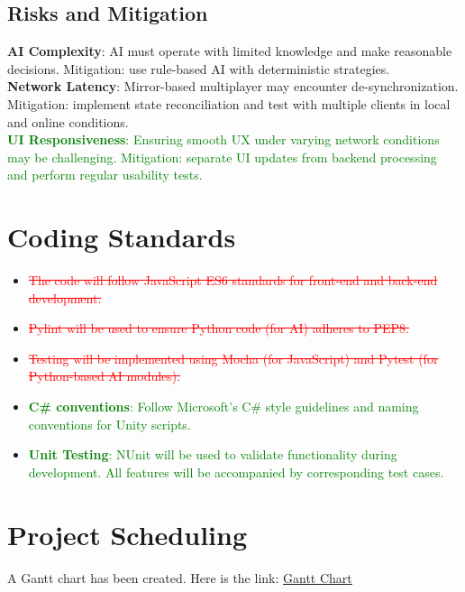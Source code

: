 \documentclass[12pt]{article}
\newcommand{\removed}[1]{\textcolor{red}{\sout{#1}}}
\newcommand{\added}[1]{\textcolor{green}{#1}}
\begin{document}
\subsection*{Risks and Mitigation}
\textbf{AI Complexity}: AI must operate with limited knowledge and make reasonable decisions. Mitigation: use rule-based AI with deterministic strategies.\\
\textbf{Network Latency}: Mirror-based multiplayer may encounter de-synchronization. Mitigation: implement state reconciliation and test with multiple clients in local and online conditions.\\
\added{\textbf{UI Responsiveness}: Ensuring smooth UX under varying network conditions may be challenging. Mitigation: separate UI updates from backend processing and perform regular usability tests.}

\section*{Coding Standards}
\begin{itemize}
    \item \removed{The code will follow JavaScript ES6 standards for front-end and back-end development.}
    \item \removed{Pylint will be used to ensure Python code (for AI) adheres to PEP8.}
    \item \removed{Testing will be implemented using Mocha (for JavaScript) and Pytest (for Python-based AI modules).}
    \item \added{\textbf{C\# conventions}: Follow Microsoft’s C\# style guidelines and naming conventions for Unity scripts.}
    \item \added{ \textbf{Unit Testing}: NUnit will be used to validate functionality during development. All features will be accompanied by corresponding test cases.}
\end{itemize}

\section*{Project Scheduling}
A Gantt chart has been created. Here is the link: \href{https://github.com/simon-0215/UNO-Flip-3D/blob/main/Gantt_Deliverable_1.xlsx}{Gantt Chart}
\end{document}
